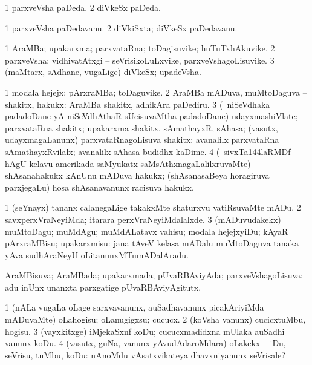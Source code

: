 \bentry
{}
\gl{\gu}
\bmng
\bnum
\num{1} parxveVsha paDeda. 
\num{2} diVkeSx paDeda. 
\enum
\emng
\eentry

\bentry
{}
\gl{\nA}
\bmng
\bnum
\num{1} parxveVsha paDedavanu. 
\num{2} diVkiSxta; diVkeSx paDedavanu. 
\enum
\emng
\eentry

\bentry
{}
\gl{\nA}
\bmng
\bnum
\num{1} AraMBa; upakarxma; parxvataRna; toDagisuvike; huTuTxhAkuvike. 
\num{2} parxveVsha; vidhivatAtxgi -- seVrisikoLuLxvike, parxveVshagoLisuvike. 
\num{3} (maMtarx, sAdhane, \mo vugaLige) diVkeSx; upadeVsha. 
\enum
\emng
\eentry

\bentry
{}
\gl{\nA}
\bmng
\bnum
\num{1} modala hejejx; pArxraMBa; toDaguvike. 
\num{2} AraMBa mADuva, muMtoDaguva -- shakitx, hakukx:  AraMBa shakitx, adhikAra paDediru. 
\num{3} (\kanmu\ niSeVdhaka padadoDane yA niSeVdhAthaR sUcisuvaMtha padadoDane) udayxmashiVlate; parxvataRna shakitx; upakarxma shakitx, sAmathayxR, sAhasa; (vasutx, udayxmagaLanunx) parxvataRnagoLisuva shakitx:  avanalilx parxvataRna sAmathayxRvilalx; avanalilx sAhasa budidhx kaDime. 
\num{4} (\kanmu\ sivxTa\char144laRMDf hAgU kelavu amerikada saMyukatx saMsAthxnagaLalilxruvaMte) shAsanahakukx kAnUnu mADuva hakukx; (shAsanasaBeya horagiruva parxjegaLu) hosa shAsanavanunx racisuva hakukx. 
\enum
\emng

\noindent 
\gl{\nuga}
\bmng
\bnum
\num{1}  (seYnayx) tananx calanegaLige takakxMte shaturxvu vatiRsuvaMte mADu. 
\num{2}  savxperxVraNeyiMda; itarara perxVraNeyiMdalalxde. 
\num{3}  (mADuvudakekx) muMtoDagu; muMdAgu; muMdALatavx vahisu; modala hejejxyiDu; kAyaR pArxraMBisu; upakarxmisu:  jana tAveV kelasa mADalu muMtoDaguva tanaka yAva sudhAraNeyU oLitanunxMTumADalAradu. 
\enum
\emng
\eentry

\bentry
{}
\gl{\gu}
\bmng
AraMBisuva; AraMBada; upakarxmada; pUvaRBAviyAda; parxveVshagoLisuva:  adu inUnx unanxta parxgatige pUvaRBAviyAgitutx. 
\emng
\eentry

\bentry
{}
\gl{\sakirx}
\bmng
\bnum
\num{1} (nALa \mo vugaLa oLage sarxvavanunx, auSadhavanunx picakAriyiMda mADuvaMte) oLahogisu; oLanugigxsu; cucucx. 
\num{2} (koVsha \mo vanunx) cucicxtuMbu, hogisu. 
\num{3} (vayxkitxge) iMjekaSxnf koDu; cucucxmadidxna mUlaka auSadhi \mo vanunx koDu. 
\num{4} (vasutx, guNa, \mo vanunx yAvudAdaroMdara) oLakekx -- iDu, seVrisu, tuMbu, koDu:  nAnoMdu vAsatxvikateya dhavxniyanunx seVrisale? 
\enum
\emng
\eentry

